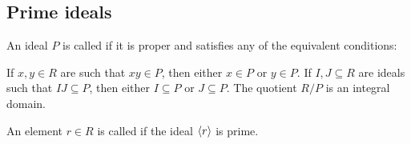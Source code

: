 \subsection{Prime ideals}\label{subsec:prime_ideals}

\begin{definition}\label{def:prime_ring_ideal}
  An ideal \( P \) is called  if it is proper and satisfies any of the equivalent conditions:
  \begin{DefEnum}
     If \( x, y \in R \) are such that \( xy \in P \), then either \( x \in P \) or \( y \in P \).
     If \( I, J \subseteq R \) are ideals such that \( IJ \subseteq P \), then either \( I \subseteq P \) or \( J \subseteq P \).
     The quotient \( R / P \) is an integral domain.
  \end{DefEnum}

  An element \( r \in R \) is called  if the ideal \( \left\langle r \right\rangle \) is prime.
\end{definition}
